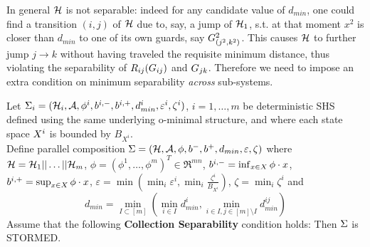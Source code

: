 In general $\mathcal{H}$ is not separable: indeed for any candidate value of $d_{min}$, one could find a transition $(i,j)$ of $\mathcal{H}$ due to, say, a jump of $\mathcal{H}_1$, s.t. at that moment $x^2$ is closer than $d_{min}$ to one of its own guards, say $G^2_{(j^2,k^2)}$. 
This causes $\mathcal{H}$ to further jump $j \rightarrow k$ without having traveled the requisite minimum distance, thus violating the separability of $R_{ij}(G_{ij})$ and $G_{jk}$.
Therefore we need to impose an extra condition on minimum separability \emph{across} sub-systems.
\begin{thm}
	\label{thm:SHS composition}		
	Let $\Sigma_i = (\mathcal{H}_i, \mathcal{A}, \phi^i,b^{i,-},b ^{i,+}, d_{min}^i, \varepsilon^i, \zeta^i)$, $i=1,\ldots,m$ be deterministic SHS 
	defined using the same underlying o-minimal structure, 
	and where each state space $X^i$ is bounded by $B_{X^i}$.
	\\
	Define parallel composition $\Sigma = (\mathcal{H}, \mathcal{A}, \phi,b^-,b^+, d_{min}, \varepsilon, \zeta)$ where
	$\mathcal{H} = \mathcal{H}_1 || \ldots ||\mathcal{H}_m$,	
	$\phi = (\phi^1,\ldots,\phi^m)^T \in \Re^{mn}$,
	$b^{i,-} = \inf_{x \in X} \phi\cdot x$,
	$b^{i,+} = \sup_{x \in X} \phi\cdot x$,
	$\varepsilon = \min(\min_i \varepsilon^i, \min_i \frac{\zeta^i}{B_{X^i}})$,
	$\zeta = \min_i \zeta^i$ and
	\[d_{min} = \min_{I\subset [m]} (\min_{i\in I}d_{min}^i, \min_{i\in I ,j \in [m]\setminus I }d_{min}^{ij})\]	
	Assume that the following \textbf{Collection Separability} condition holds: 	
	Then $\Sigma$ is STORMED.
\end{thm}

